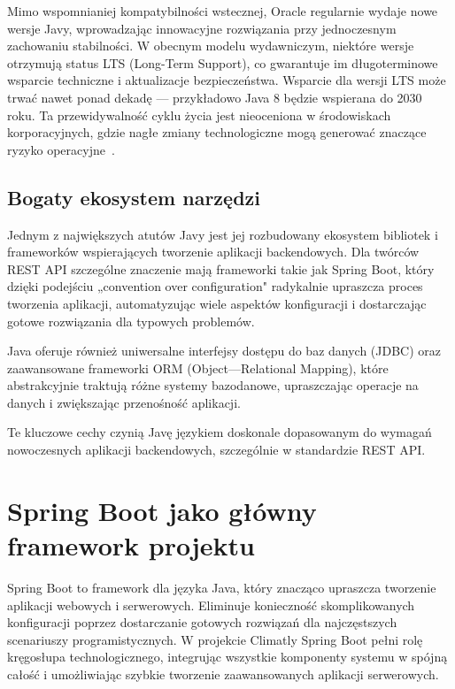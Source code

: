 \documentclass[a4paper,12pt,openany]{book}
\begin{document}
Mimo wspomnianiej kompatybilności wstecznej, Oracle regularnie wydaje nowe wersje Javy, wprowadzając innowacyjne rozwiązania przy jednoczesnym zachowaniu stabilności. W obecnym modelu wydawniczym, niektóre wersje otrzymują status LTS (Long-Term Support), co gwarantuje im długoterminowe wsparcie techniczne i aktualizacje bezpieczeństwa. Wsparcie dla wersji LTS może trwać nawet ponad dekadę --- przykładowo Java 8 będzie wspierana do 2030 roku. Ta przewidywalność cyklu życia jest nieoceniona w środowiskach korporacyjnych, gdzie nagłe zmiany technologiczne mogą generować znaczące ryzyko operacyjne~\cite{bib:oracle2023lts}.

\subsection*{Bogaty ekosystem narzędzi}

Jednym z największych atutów Javy jest jej rozbudowany ekosystem bibliotek i frameworków wspierających tworzenie aplikacji backendowych. Dla twórców REST API szczególne znaczenie mają frameworki takie jak Spring Boot, który dzięki podejściu „convention over configuration" radykalnie upraszcza proces tworzenia aplikacji, automatyzując wiele aspektów konfiguracji i dostarczając gotowe rozwiązania dla typowych problemów.

Java oferuje również uniwersalne interfejsy dostępu do baz danych (JDBC) oraz zaawansowane frameworki ORM (Object---Relational Mapping), które abstrakcyjnie traktują różne systemy bazodanowe, upraszczając operacje na danych i zwiększając przenośność aplikacji.

\vspace{0.5cm}

Te kluczowe cechy czynią Javę językiem doskonale dopasowanym do wymagań nowoczesnych aplikacji backendowych, szczególnie w standardzie REST API.


\section{Spring Boot jako główny framework projektu}

Spring Boot to framework dla języka Java, który znacząco upraszcza tworzenie aplikacji webowych i serwerowych. Eliminuje konieczność skomplikowanych konfiguracji poprzez dostarczanie gotowych rozwiązań dla najczęstszych scenariuszy programistycznych. W projekcie Climatly Spring Boot pełni rolę kręgosłupa technologicznego, integrując wszystkie komponenty systemu w spójną całość i umożliwiając szybkie tworzenie zaawansowanych aplikacji serwerowych.
\end{document}
